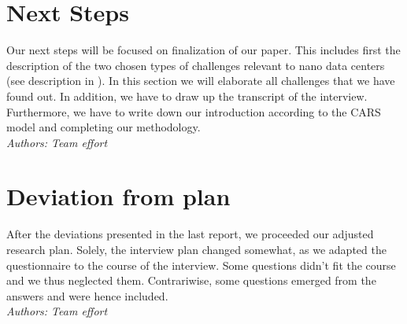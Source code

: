 \documentclass[sigchi-a, authorversion]{acmart}
\begin{document}
\section{Next Steps}
\label{sec:next_steps}
Our next steps will be focused on finalization of our paper. This includes first the description of the two chosen types of challenges relevant to nano data centers (see description in ). In this section we will elaborate all challenges that we have found out. In addition, we have to draw up the transcript of the interview. Furthermore, we have to write down our introduction according to the CARS model and completing our methodology.\\
\textit{Authors: Team effort}\\

\section{Deviation from plan}
\label{deviation_from_plan}
After the deviations presented in the last report, we proceeded our adjusted research plan. Solely, the interview plan changed somewhat, as we adapted the questionnaire to the course of the interview. Some questions didn't fit the course and we thus neglected them. Contrariwise, some questions emerged from the answers and were hence included. \\
\textit{Authors: Team effort}\\

\nocite{*}


\end{document}

